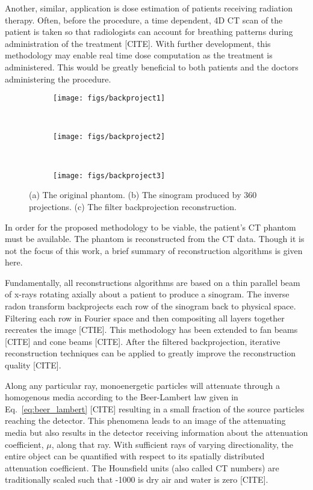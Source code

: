 Another, similar, application is dose estimation of patients receiving radiation therapy. Often, before the procedure, a time dependent, 4D CT scan of the patient is taken so that radiologists can account for breathing patterns during administration of the treatment [CITE]. With further development, this methodology may enable real time dose computation as the treatment is administered. This would be greatly beneficial to both patients and the doctors administering the procedure.

\begin{figure}
    \centering
    \begin{subfigure}[b]{0.38\textwidth}
        \texttt{[image: figs/backproject1]}
        \caption{}
        \label{fig:beamconexy}
    \end{subfigure}
    ~
    \begin{subfigure}[b]{0.19\textwidth}
        \texttt{[image: figs/backproject2]}
        \caption{}
        \label{fig:beamfanxy}
    \end{subfigure}
    ~
    \begin{subfigure}[b]{0.38\textwidth}
        \texttt{[image: figs/backproject3]}
        \caption{}
        \label{fig:subsweep_general3}
    \end{subfigure}
    \caption{(a) The original phantom. (b) The sinogram produced by 360 projections. (c) The filter backprojection reconstruction.}\label{fig:backprojection}
\end{figure}

In order for the proposed methodology to be viable, the patient's CT phantom must be available. The phantom is reconstructed from the CT data. Though it is not the focus of this work, a brief summary of reconstruction algorithms is given here.

Fundamentally, all reconstructions algorithms are based on a thin parallel beam of x-rays rotating axially about a patient to produce a sinogram. The inverse radon transform backprojects each row of the sinogram back to physical space. Filtering each row in Fourier space and then compositing all layers together recreates the image [CTIE]. This methodology has been extended to fan beams [CITE] and cone beams [CITE]. After the filtered backprojection, iterative reconstruction techniques can be applied to greatly improve the reconstruction quality [CITE].

Along any particular ray, monoenergetic particles will attenuate through a homogenous media according to the Beer-Lambert law given in Eq.~\ref{eq:beer_lambert} [CITE] resulting in a small fraction of the source particles reaching the detector. This phenomena leads to an image of the attenuating media but also results in the detector receiving information about the attenuation coefficient, $\mu$, along that ray. With sufficient rays of varying directionality, the entire object can be quantified with respect to its spatially distributed attenuation coefficient. The Hounsfield units (also called CT numbers) are traditionally scaled such that -1000 is dry air and water is zero [CITE].

